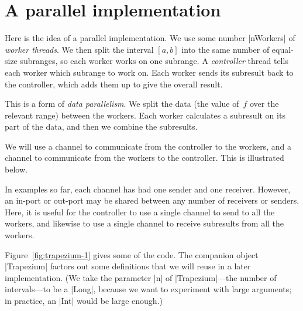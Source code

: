 \section{A parallel implementation}

Here is the idea of a parallel implementation.  We use some number |nWorkers|
of \emph{worker threads}.  We then split the interval $[a,b]$ into the same
number of equal-size subranges, so each worker works on one subrange.  A
\emph{controller} thread tells each worker which subrange to work on.  Each
worker sends its subresult back to the controller, which adds them up to give
the overall result.

This is a form of \emph{data parallelism}.  We split the data (the value
of~$f$ over the relevant range) between the workers.  Each worker calculates a
subresult on its part of the data, and then we combine the subresults. 


We will use a channel  to communicate from the
controller to the workers, and a channel 
to communicate from the workers to the controller.  This is illustrated below.
%
\begin{center}
\end{center}

In examples so far, each channel has had one sender and one receiver.
However, an in-port or out-port may be shared between any number of receivers
or senders.  Here, it is useful for the controller to use a single channel to
send to all the workers, and likewise to use a single channel to receive
subresults from all the workers.

Figure~\ref{fig:trapezium-1} gives some of the code.  The companion object
|Trapezium| factors out some definitions that we will reuse in a later
implementation.  (We take the parameter |n| of |Trapezium|---the number of
intervals---to be a |Long|, because we want to experiment with large
arguments; in practice, an |Int| would be large enough.)

